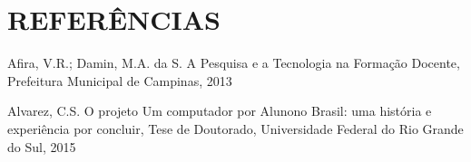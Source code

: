 \documentclass[
12pt,		%
openright,	%
twoside,  %
a4paper,			%
chapter=TITLE,		%
english,			%
french,				%
spanish,			%
brazil				%
]{USPSC-classe/USPSC}
\begin{document}
\chapter[REFER\^ENCIAS]{REFER\^ENCIAS}\label{REFER\^ENCIAS}
\begin{flushleft}
\begin{flushleft}
\begin{flushleft}
\begin{flushleft}
\begin{flushleft}
\begin{flushleft}
\begin{flushleft}
\begin{flushleft}
\begin{flushleft}
[AFIRA, 2013] Afira, V.R.; Damin, M.A. da S. A Pesquisa e a Tecnologia na Forma\c{c}\~ao Docente, Prefeitura Municipal de Campinas, 2013
\end{flushleft}


\end{flushleft}


\end{flushleft}


\end{flushleft}


\end{flushleft}


\end{flushleft}


\end{flushleft}


\end{flushleft}


\end{flushleft}


\begin{flushleft}
\begin{flushleft}
\begin{flushleft}
\begin{flushleft}
\begin{flushleft}
\begin{flushleft}
\begin{flushleft}
\begin{flushleft}
\begin{flushleft}
[ALVAREZ, 2015] Alvarez, C.S. O projeto \textquotedbl Um computador por Aluno\textquotedbl  no Brasil: uma hist\'oria e experi\^encia por concluir, Tese de Doutorado, Universidade Federal do Rio Grande do Sul, 2015
\end{flushleft}


\end{flushleft}


\end{flushleft}


\end{flushleft}


\end{flushleft}


\end{flushleft}


\end{flushleft}


\end{flushleft}


\end{flushleft}
\end{document}
